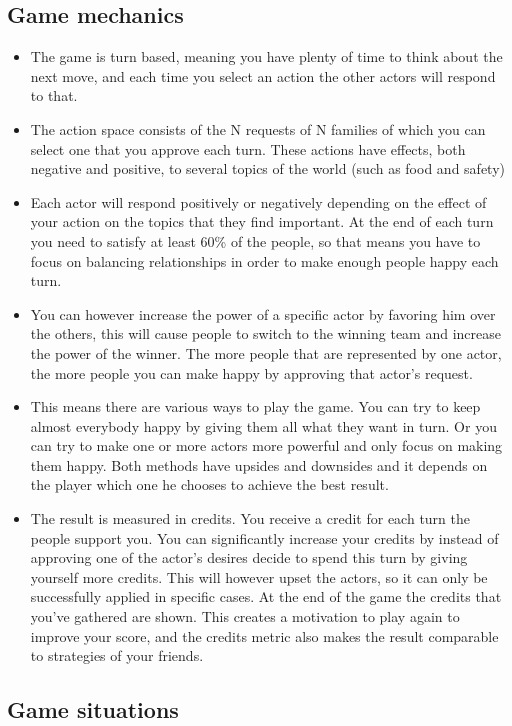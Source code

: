\documentclass[11pt,a4paper]{article}
\begin{document}
\subsection{Game mechanics}
  \begin{itemize}
    \item The game is turn based, meaning you have plenty of time to think about the next move, and each time you select an action the other actors will respond to that.
    \item The action space consists of the N requests of N families of which you can select one that you approve each turn. These actions have effects, both negative and positive, to several topics of the world (such as food and safety)
    \item Each actor will respond positively or negatively depending on the effect of your action on the topics that they find important. At the end of each turn you need to satisfy at least 60\% of the people, so that means you have to focus on balancing relationships in order to make enough people happy each turn.
    \item You can however increase the power of a specific actor by favoring him over the others, this will cause people to switch to the winning team and increase the power of the winner. The more people that are represented by one actor, the more people you can make happy by approving that actor's request.
    \item This means there are various ways to play the game. You can try to keep almost everybody happy by giving them all what they want in turn. Or you can try to make one or more actors more powerful and only focus on making them happy. Both methods have upsides and downsides and it depends on the player which one he chooses to achieve the best result.
    \item The result is measured in credits. You receive a credit for each turn the people support you. You can significantly increase your credits by instead of approving one of the actor's desires decide to spend this turn by giving yourself more credits. This will however upset the actors, so it can only be successfully applied in specific cases. At the end of the game the credits that you've gathered are shown. This creates a motivation to play again to improve your score, and the credits metric also makes the result comparable to strategies of your friends.
  \end{itemize}
\subsection{Game situations}
\end{document}
